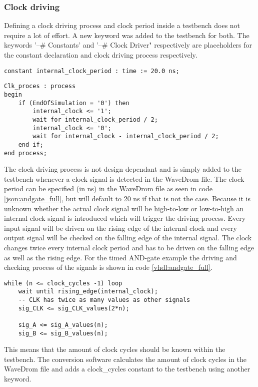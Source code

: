 \subsubsection{Clock driving}
Defining a clock driving process and clock period inside a testbench does not require a lot of effort. A new keyword was added to the testbench for both. The keywords '--\# Constants' and  '--\# Clock Driver" respectively are placeholders for the constant declaration and clock driving process respectively. 
\begin{lstlisting}[style=vhdl, caption={Definition of a std\_logic array}, label={vhdl:clock_period}]
constant internal_clock_period : time := 20.0 ns;
\end{lstlisting}\nline
\begin{lstlisting}[style=vhdl, caption={Signal driving in clocked designs}, label={vhdl:driving_signals}]
Clk_proces : process
begin
	if (EndOfSimulation = '0') then
		internal_clock <= '1';
		wait for internal_clock_period / 2;
		internal_clock <= '0';
		wait for internal_clock - internal_clock_period / 2;
	end if;
end process;
\end{lstlisting}\nline
The clock driving process is not design dependant and is simply added to the testbench whenever a clock signal is detected in the WaveDrom file. The clock period can be specified (in ns) in the WaveDrom file as seen in code \ref{json:andgate_full}, but will default to 20 ns if that is not the case.
\npar
Because it is unknown whether the actual clock signal will be high-to-low or low-to-high an internal clock signal is introduced which will trigger the driving process. Every input signal will be driven on the rising edge of the internal clock and every output signal will be checked on the falling edge of the internal signal. The clock changes twice every internal clock period and has to be driven on the falling edge as well as the rising edge. For the timed AND-gate example the driving and checking process of the signals is shown in code \ref{vhdl:andgate_full}.\newpage
\begin{lstlisting}[style=vhdl, caption={Signal driving in the AND-gate test derived from the source file in code \ref{json:andgate_full}}, label={vhdl:andgate_full}]
while (n <= clock_cycles -1) loop
	wait until rising_edge(internal_clock);
	-- CLK has twice as many values as other signals
	sig_CLK <= sig_CLK_values(2*n);		
	
	sig_A <= sig_A_values(n);
	sig_B <= sig_B_values(n);
\end{lstlisting}\nline
This means that the amount of clock cycles should be known within the testbench. The conversion software calculates the amount of clock cycles in the WaveDrom file and adds a clock\_cycles constant to the testbench using another keyword.
